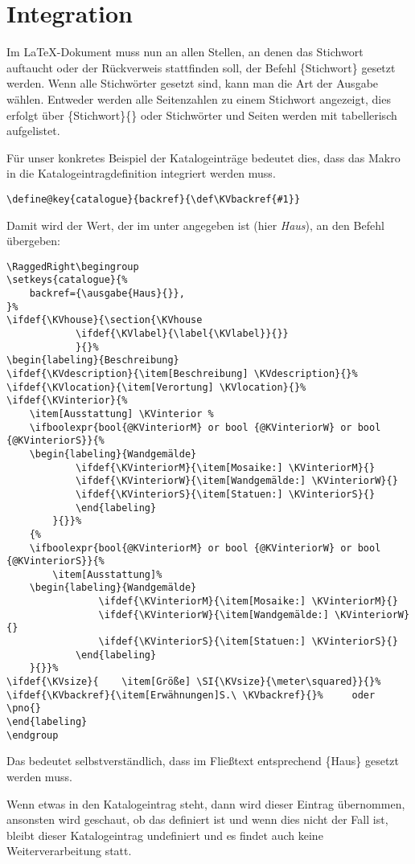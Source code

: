 \documentclass[ngerman]{dtk}
\makeatletter
\newcommand\catalogueentry[1]{%
\RaggedRight\begingroup
\setkeys{catalogue}{#1}%
\ifdef{\KVhouse}{\section{\KVhouse
			\ifdef{\KVlabel}{\label{\KVlabel}}{}}
			}{}%
\begin{labeling}{Beschreibung}
\ifdef{\KVdescription}{\item[Beschreibung] \KVdescription}{}%
\ifdef{\KVlocation}{\item[Verortung] \KVlocation}{}%
\ifdef{\KVinterior}{%
	\item[Ausstattung] \KVinterior %
	\ifboolexpr{bool{@KVinteriorM} or bool {@KVinteriorW} or bool {@KVinteriorS}}{%
	\begin{labeling}{Wandgemälde}
			\ifdef{\KVinteriorM}{\item[Mosaike:] \KVinteriorM}{}
			\ifdef{\KVinteriorW}{\item[Wandgemälde:] \KVinteriorW}{}
			\ifdef{\KVinteriorS}{\item[Statuen:] \KVinteriorS}{}
			\end{labeling}
		}{}}%
	{%
	\ifboolexpr{bool{@KVinteriorM} or bool {@KVinteriorW} or bool {@KVinteriorS}}{%
		\item[Ausstattung]%
	\begin{labeling}{Wandgemälde}	
				\ifdef{\KVinteriorM}{\item[Mosaike:] \KVinteriorM}{}
				\ifdef{\KVinteriorW}{\item[Wandgemälde:] \KVinteriorW}{}
				\ifdef{\KVinteriorS}{\item[Statuen:] \KVinteriorS}{}
			\end{labeling}
	}{}}%
\ifdef{\KVsize}{	\item[Größe] \SI{\KVsize}{\meter\squared}}{}%
\ifdef{\KVbackref}{\item[Erwähnungen]S.\ \KVbackref}{}%
\end{labeling}
\endgroup
}
\newcommand{\ausgabe}[2]{#2}
\makeatother
\begin{document}
\section{Integration}

Im \LaTeX-Dokument muss nun an allen Stellen, an denen das Stichwort auftaucht oder der Rückverweis stattfinden soll,
der Befehl  \{Stichwort\} gesetzt werden.
Wenn alle Stichwörter gesetzt sind, kann man die Art der Ausgabe wählen.
Entweder werden alle Seitenzahlen zu einem Stichwort angezeigt, dies erfolgt über \{Stichwort\}\{\}
oder Stichwörter und Seiten werden mit   tabellerisch aufgelistet.

Für unser konkretes Beispiel der Katalogeinträge bedeutet dies, dass das Makro  in die Katalogeintragdefinition integriert werden muss.
\begin{lstlisting}[style=number]
\define@key{catalogue}{backref}{\def\KVbackref{#1}}
\end{lstlisting}
Damit wird der Wert, der im  unter  angegeben ist (hier \emph{Haus}), an den Befehl  übergeben:
\begin{lstlisting}[style=number]
\catalogueentry{%
	backref={\ausgabe{Haus}{}},
}
\end{lstlisting}
Das bedeutet selbstverständlich, dass im Fließtext entsprechend \{Haus\} gesetzt werden muss.

Wenn etwas in den Katalogeintrag  steht, dann wird dieser Eintrag übernommen,
ansonsten wird geschaut, ob das  definiert ist und wenn dies nicht der Fall ist, bleibt dieser Katalogeintrag undefiniert und es findet auch keine Weiterverarbeitung statt. 
\end{document}
